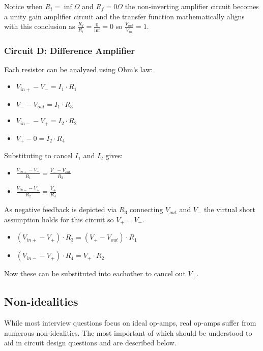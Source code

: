 \documentclass[main.tex]{subfiles}
\begin{document}
Notice when $R_i = \inf \Omega$ and $R_f = 0 \Omega$ the non-inverting amplifier circuit becomes a unity gain amplifier circuit and the transfer function mathematically aligns with this conclusion as $\frac{R_f}{R_i} = \frac{0}{\inf} = 0$ so $\frac{V_{out}}{V_{in}} = 1$. 

\subsubsection{Circuit D: Difference Amplifier}
Each resistor can be analyzed using Ohm's law: 
\begin{itemize}
    \item $V_{in+} - V_{-} = I_1 \cdot R_1$
    \item $V_{-} - V_{out} = I_1 \cdot R_3$
    \item $V_{in-} - V_{+} = I_2 \cdot R_2$
    \item $V_{+} - 0 = I_2 \cdot R_4$
\end{itemize}
Substituting to cancel $I_1$ and $I_2$ gives:
\begin{itemize}
    \item $\frac{V_{in+} - V_{-}}{R_1} = \frac{V_{-} - V_{out}}{R_3}$
    \item $\frac{V_{in-} - V_{+}}{R_2} = \frac{V_{+}}{R_4}$
\end{itemize}
As negative feedback is depicted via $R_3$ connecting $V_{out}$ and $V_{-}$ the virtual short assumption holds for this circuit so $V_{+} = V_{-}$. 
\begin{itemize}
    \item $(V_{in+} - V_{+}) \cdot R_3 = (V_{+} - V_{out}) \cdot R_1$
    \item $(V_{in-} - V_{+}) \cdot R_4 = V_{+} \cdot R_2$
\end{itemize}
Now these can be substituted into eachother to cancel out $V_{+}$. 



\subsection{Non-idealities}
While most interview questions focus on ideal op-amps, real op-amps suffer from numerous non-idealities. The most important of which should be understood to aid in circuit design questions and are described below. 
\end{document}
